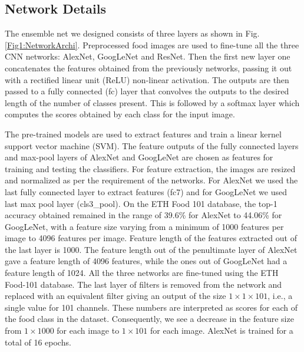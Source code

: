 \documentclass[journal]{IEEEtran}%
\begin{document}
\subsection{Network Details}
\label{NetworkDetails}
The ensemble net we designed consists of three layers as shown in Fig. \ref{Fig1:NetworkArchi}. Preprocessed food images are used to fine-tune all the three CNN networks: AlexNet, GoogLeNet and ResNet. Then the first new layer one concatenates the features obtained from the previously networks, passing it out with a rectified linear unit (ReLU) non-linear activation. The outputs are then passed to a fully connected (fc) layer that convolves the outputs to the desired length of the number of classes present. This is followed by a softmax layer which computes the scores obtained by each class for the input image.

The pre-trained models are used to extract features and train a linear kernel support vector machine (SVM). The feature outputs of the fully connected layers and max-pool layers of AlexNet and GoogLeNet are chosen as features for training and testing the classifiers. For feature extraction, the images are resized and normalized as per the requirement of the networks. For AlexNet we used the last fully connected layer to extract features (fc7) and for GoogLeNet we used last max pool layer (cls3\_pool). On the ETH Food 101 database, the top-1 accuracy obtained remained in the range of 39.6\% for AlexNet to 44.06\% for GoogLeNet, with a feature size varying from a minimum of 1000 features per image to 4096 features per image. Feature length of the features extracted out of the last layer is 1000. The feature length out of the penultimate layer of AlexNet gave a feature length of 4096 features, while the ones out of GoogLeNet had a feature length of 1024. All the three networks are fine-tuned using the ETH Food-101 database. The last layer of filters is removed from the network and replaced with an equivalent filter giving an output of the size $1\times1\times101$, i.e., a single value for 101 channels. These numbers are interpreted as scores for each of the food class in the dataset. Consequently, we see a decrease in the feature size from $1\times1000$ for each image to $1\times101$ for each image. AlexNet is trained for a total of 16 epochs.
\end{document}
